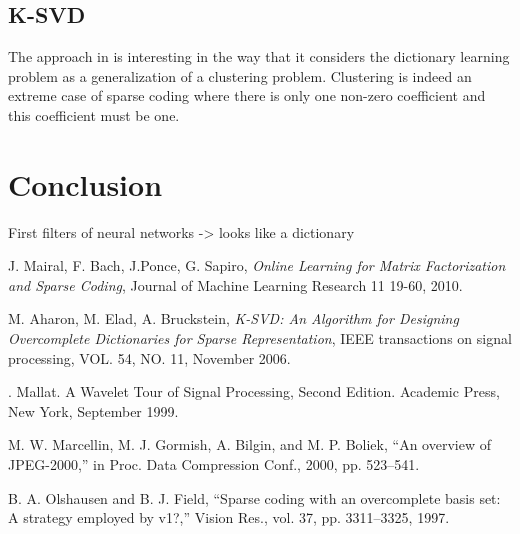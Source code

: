 \documentclass[a4paper,11pt]{article}
\begin{document}
\subsection{K-SVD}
The approach in \cite{aharon06} is interesting in the way that it considers the dictionary learning problem as a generalization of a clustering problem. Clustering is indeed an extreme case of sparse coding where there is only one non-zero coefficient and this coefficient must be one.

\section{Conclusion}
First filters of neural networks -> looks like a dictionary



\begin{thebibliography}{9}
  J. Mairal, F. Bach, J.Ponce, G. Sapiro,
  \emph{Online Learning for Matrix Factorization and Sparse Coding},
  Journal of Machine Learning Research 11 19-60, 2010.

  M. Aharon, M. Elad, A. Bruckstein,
  \emph{K-SVD: An Algorithm for Designing Overcomplete Dictionaries for Sparse Representation},
  IEEE transactions on signal processing, VOL. 54, NO. 11, November 2006.

. Mallat. A Wavelet Tour of Signal Processing, Second Edition. Academic Press, New York,
September 1999.


M. W. Marcellin, M. J. Gormish, A. Bilgin, and M. P. Boliek, “An
overview of JPEG-2000,” in Proc. Data Compression Conf., 2000, pp.
523–541.

B. A. Olshausen and B. J. Field, “Sparse coding with an overcomplete
basis set: A strategy employed by v1?,” Vision Res., vol. 37, pp.
3311–3325, 1997.



\end{thebibliography}
\end{document}
